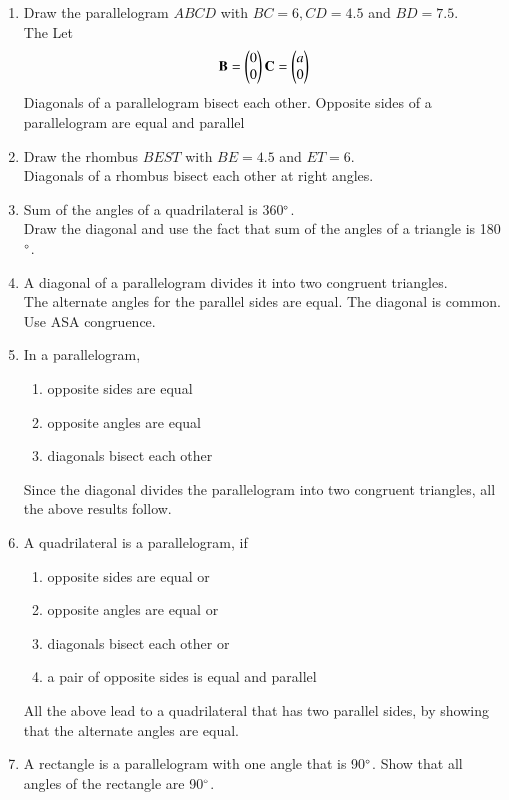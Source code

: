 \begin{enumerate}[label=\arabic*.,ref=\thesubsection.\theenumi]
\item Draw the parallelogram $ABCD$ with $BC = 6, CD = 4.5$ and $BD=7.5$.
\\
\solution The 
Let 
%
\begin{align}
\mathbf{B} = \begin{pmatrix}0\\0\end{pmatrix}
\mathbf{C} = \begin{pmatrix}a\\0\end{pmatrix}
\end{align}
%
Diagonals of a parallelogram bisect each other.  Opposite sides of a parallelogram are equal and parallel
\item Draw the rhombus $BEST$ with $BE = 4.5$ and $ET = 6$. 
\\
\solution Diagonals of a rhombus bisect each other at right angles.
\item Sum of the angles of a quadrilateral is 360$\degree$. 
\\
\solution Draw the diagonal and use the fact that sum of the angles of a triangle is 180$\degree$.
\item  A diagonal of a parallelogram divides it into two congruent triangles. 
\\
\solution The alternate angles for the parallel sides are equal.  The diagonal is common.  Use ASA congruence.
%
\item  In a parallelogram, 
\begin{enumerate}
\item opposite sides are equal 
\item  opposite angles are equal
\item  diagonals bisect each other
\end{enumerate}
%
\solution Since the diagonal divides the parallelogram into two congruent triangles, all the above results follow.
%
\item  A quadrilateral is a parallelogram, if 
%
\begin{enumerate}
\item opposite sides are equal or 
\item  opposite angles are equal or 
\item  diagonals bisect each other or 
\item a pair of opposite sides is equal and parallel
\end{enumerate}
%
\solution All the above lead to a quadrilateral that has two parallel sides, by showing that the alternate angles are equal.
%
%
\item A rectangle is a parallelogram with one angle that is 90$\degree$.  Show that all angles of the rectangle are 90$\degree$.

\end{enumerate}
